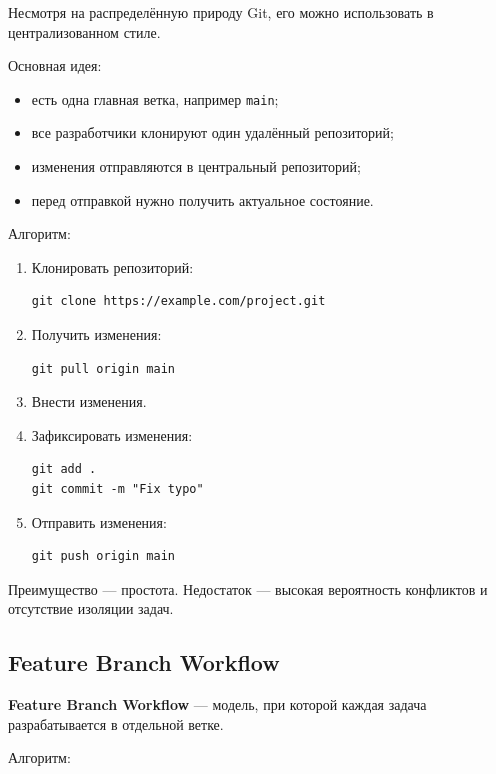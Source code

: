 \documentclass[12pt,a4paper]{article}
\begin{document}
Несмотря на распределённую природу Git, его можно использовать в централизованном стиле.

Основная идея:

\begin{itemize}
    \item есть одна главная ветка, например \texttt{main};
    \item все разработчики клонируют один удалённый репозиторий;
    \item изменения отправляются в центральный репозиторий;
    \item перед отправкой нужно получить актуальное состояние.
\end{itemize}

Алгоритм:

\begin{enumerate}
    \item Клонировать репозиторий:
\begin{lstlisting}
git clone https://example.com/project.git
\end{lstlisting}

    \item Получить изменения:
\begin{lstlisting}
git pull origin main
\end{lstlisting}

    \item Внести изменения.

    \item Зафиксировать изменения:
\begin{lstlisting}
git add .
git commit -m "Fix typo"
\end{lstlisting}

    \item Отправить изменения:
\begin{lstlisting}
git push origin main
\end{lstlisting}
\end{enumerate}

Преимущество --- простота. Недостаток --- высокая вероятность конфликтов и отсутствие изоляции задач.

\subsection{Feature Branch Workflow}

\textbf{Feature Branch Workflow} --- модель, при которой каждая задача разрабатывается в отдельной ветке.

Алгоритм:
\end{document}
